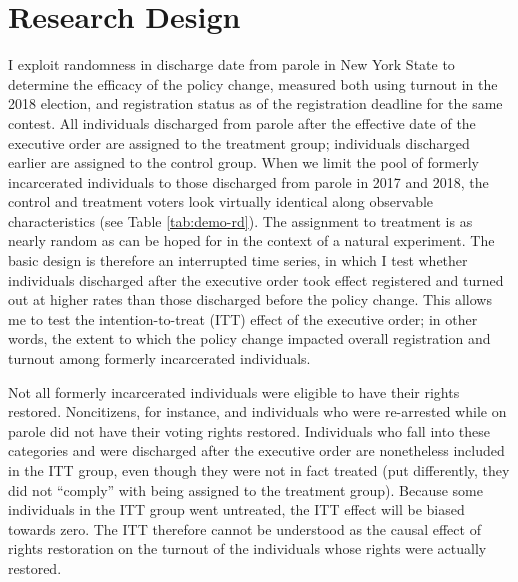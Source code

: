 \documentclass[
  12pt,
]{article}
\begin{document}
\hypertarget{research-design}{%
\section*{Research Design}\label{research-design}}

I exploit randomness in discharge date from parole in New York State to determine the efficacy of the policy change, measured both using turnout in the 2018 election, and registration status as of the registration deadline for the same contest. All individuals discharged from parole after the effective date of the executive order are assigned to the treatment group; individuals discharged earlier are assigned to the control group. When we limit the pool of formerly incarcerated individuals to those discharged from parole in 2017 and 2018, the control and treatment voters look virtually identical along observable characteristics (see Table \ref{tab:demo-rd}). The assignment to treatment is as nearly random as can be hoped for in the context of a natural experiment. The basic design is therefore an interrupted time series, in which I test whether individuals discharged after the executive order took effect registered and turned out at higher rates than those discharged before the policy change. This allows me to test the intention-to-treat (ITT) effect of the executive order; in other words, the extent to which the policy change impacted overall registration and turnout among formerly incarcerated individuals.

Not all formerly incarcerated individuals were eligible to have their rights restored. Noncitizens, for instance, and individuals who were re-arrested while on parole did not have their voting rights restored. Individuals who fall into these categories and were discharged after the executive order are nonetheless included in the ITT group, even though they were not in fact treated (put differently, they did not ``comply'' with being assigned to the treatment group). Because some individuals in the ITT group went untreated, the ITT effect will be biased towards zero. The ITT therefore cannot be understood as the causal effect of rights restoration on the turnout of the individuals whose rights were actually restored.
\end{document}
